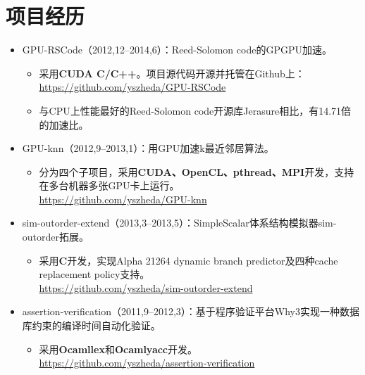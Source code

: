 \documentclass[letterpaper]{article}
\begin{document}
\section*{项目经历}
\begin{itemize}
    \item GPU-RSCode（2012,12--2014,6）：Reed-Solomon code的GPGPU加速。
        \begin{itemize}
            \item 采用\textbf{CUDA C/C++}。项目源代码开源并托管在Github上：\\
                \url{https://github.com/yszheda/GPU-RSCode}
            \item 与CPU上性能最好的Reed-Solomon code开源库Jerasure相比，有14.71倍的加速比。
        \end{itemize}
    \item GPU-knn（2012,9--2013,1）：用GPU加速k最近邻居算法。
        \begin{itemize}
            \item 分为四个子项目，采用\textbf{CUDA、OpenCL、pthread、MPI}开发，支持在多台机器多张GPU卡上运行。
                \\ \url{https://github.com/yszheda/GPU-knn}
        \end{itemize}
    \item sim-outorder-extend（2013,3--2013,5）：SimpleScalar体系结构模拟器sim-outorder拓展。
        \begin{itemize}
            \item 采用\textbf{C}开发，实现Alpha 21264 dynamic branch predictor及四种cache replacement policy支持。
                \\ \url{https://github.com/yszheda/sim-outorder-extend}
        \end{itemize}
    \item assertion-verification（2011,9--2012,3）：基于程序验证平台Why3实现一种数据库约束的编译时间自动化验证。
        \begin{itemize}
            \item 采用\textbf{Ocamllex}和\textbf{Ocamlyacc}开发。
                \\ \url{https://github.com/yszheda/assertion-verification}
        \end{itemize}

\end{itemize}
\end{document}
